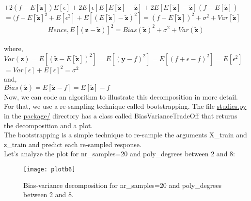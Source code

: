 $+ 2(f-E[\boldsymbol{\tilde{z}}])E[\epsilon] + 2E[\epsilon]E[E[\boldsymbol{\tilde{z}}]-\boldsymbol{\tilde{z}}] + 2E[E[\boldsymbol{\tilde{z}}]-\boldsymbol{\tilde{z}}](f-E[\boldsymbol{\tilde{z}}])$ \\

$= (f-E[\boldsymbol{\tilde{z}}]^{2} + E[\epsilon^{2}]+E[(E[\boldsymbol{\tilde{z}}]-\boldsymbol{\tilde{z}})^{2}] = (f-E[\boldsymbol{\tilde{z}}])^{2}+\sigma^{2}+Var[\boldsymbol{\tilde{z}}]$ \\

\begin{equation}
\label{bias-variance-decomposition}
Hence, E[(\boldsymbol{z} - \boldsymbol{\tilde{z}})]^{2} = Bias(\boldsymbol{\tilde{z}})^{2} + \sigma^{2} + Var(\boldsymbol{\tilde{z}})
\end{equation} \\

\noindent where, \\

$Var(\textbf{z}) = E[(\boldsymbol{\tilde{z}}-E[\boldsymbol{\tilde{z}}])^{2}] = E[(\textbf{y}-f)^{2}] = E[(f+\epsilon-f)^{2}]=E[\epsilon^{2}]$ \\

$=Var[\epsilon]+E[\epsilon]^{2} = \sigma^{2}$ \\

\noindent and, \\

$Bias(\boldsymbol{\tilde{z}}) = E[\boldsymbol{\tilde{z}}-f]=E[\boldsymbol{\tilde{z}}]-f $ \\

Now, we can code an algorithm to illustrate this decomposition in more detail. For that, we use a re-sampling technique called bootstrapping. The file \href{https://github.com/fabiorodp/UiO-FYS-STK4155/blob/master/Project1/package/studies.py}{studies.py} in the \href{https://github.com/fabiorodp/UiO-FYS-STK4155/tree/master/Project1/package}{package/} directory has a class called BiasVarianceTradeOff that returns the decomposition and a plot. \\

The bootstrapping is a simple technique to re-sample the arguments X\_train and z\_train and predict each re-sampled response. \\

Let's analyze the plot for nr\_samples=20 and poly\_degrees between 2 and 8:

\begin{figure}[h]
\label{fig:plotB6}
\texttt{[image: plotb6]}
\caption{Bias-variance decomposition for nr\_samples=20 and poly\_degrees between 2 and 8.}
\centering
\end{figure}\\

